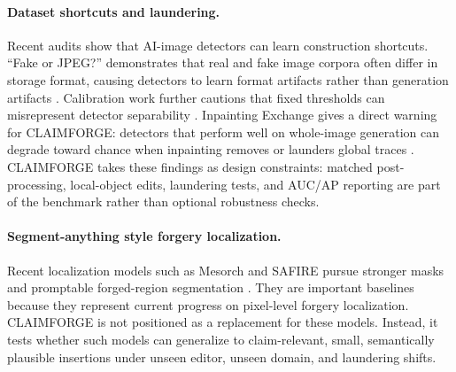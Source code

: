\paragraph{Dataset shortcuts and laundering.}
Recent audits show that AI-image detectors can learn construction shortcuts. ``Fake or JPEG?'' demonstrates that real and fake image corpora often differ in storage format, causing detectors to learn format artifacts rather than generation artifacts \citep{grommelt2024fakejpeg}. Calibration work further cautions that fixed thresholds can misrepresent detector separability \citep{yang2026calibration}. Inpainting Exchange gives a direct warning for CLAIMFORGE: detectors that perform well on whole-image generation can degrade toward chance when inpainting removes or launders global traces \citep{nebioglu2026inpaintingexchange}. CLAIMFORGE takes these findings as design constraints: matched post-processing, local-object edits, laundering tests, and AUC/AP reporting are part of the benchmark rather than optional robustness checks.

\paragraph{Segment-anything style forgery localization.}
Recent localization models such as Mesorch and SAFIRE pursue stronger masks and promptable forged-region segmentation \citep{zhu2024mesorch,kwon2024safire}. They are important baselines because they represent current progress on pixel-level forgery localization. CLAIMFORGE is not positioned as a replacement for these models. Instead, it tests whether such models can generalize to claim-relevant, small, semantically plausible insertions under unseen editor, unseen domain, and laundering shifts.
